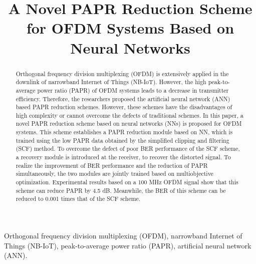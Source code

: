 \documentclass[journal]{IEEEtran}
\begin{document}
\title{A Novel PAPR Reduction Scheme for OFDM Systems Based on Neural Networks}

\author{
}

\maketitle

\begin{abstract}
Orthogonal frequency division multiplexing (OFDM) is extensively applied in the downlink of narrowband Internet of Things (NB-IoT). However, the high peak-to-average power ratio (PAPR) of OFDM systems leads to a decrease in transmitter efficiency. Therefore, the researchers proposed the artificial neural network (ANN) based PAPR reduction schemes. However, these schemes have the disadvantages of high complexity or cannot overcome the defects of traditional schemes. In this paper, a novel PAPR reduction scheme based on neural networks (NNs) is proposed for OFDM systems. This scheme establishes a PAPR reduction module based on NN, which is trained using the low PAPR data obtained by the simplified clipping and filtering (SCF) method. To overcome the defect of poor BER performance of the SCF scheme, a recovery module is introduced at the receiver, to recover the distorted signal. To realize the improvement of BER performance and the reduction of PAPR simultaneously, the two modules are jointly trained based on multiobjective optimization. Experimental results based on a 100 MHz OFDM signal show that this scheme can reduce PAPR by 4.5 dB. Meanwhile, the BER of this scheme can be reduced to 0.001 times that of the SCF scheme.
\end{abstract}

\begin{IEEEkeywords}
Orthogonal frequency division multiplexing (OFDM), narrowband Internet of Things (NB-IoT), peak-to-average power ratio (PAPR), artificial neural network (ANN).
\end{IEEEkeywords}
\end{document}
